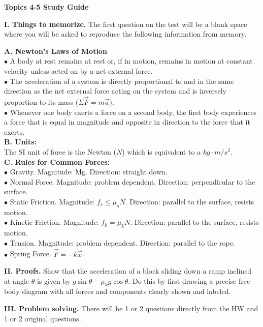 \documentclass[11pt]{article}
\begin{document}
{\centering
\textbf{Topics 4-5 Study Guide} \par
\vspace{\baselineskip}
}

\textbf{I. Things to memorize.}
The first question on the test will be a blank space where you will be asked to reproduce the following information from memory.
\vspace{0.5\baselineskip}

\begin{addmargin}[1em]{0em}%
\textbf{A. Newton's Laws of Motion} \\
$\bullet$ A body at rest remains at rest or, if in motion, remains in motion at constant velocity unless acted on by a net external force. \\
$\bullet$ The acceleration of a system is directly proportional to and in the same direction as the net external force acting on the system and is inversely proportion to its mass ($\Sigma \vec{F} = m \vec{a}$). \\
$\bullet$ Whenever one body exerts a force on a second body, the first body experiences a force that is equal in magnitude and opposite in direction to the force that it exerts. \\

\textbf{B. Units:} \\
The SI unit of force is the Newton ($N$) which is equivalent to a $kg\cdot m/s^2$. \\

\textbf{C. Rules for Common Forces:} \\
$\bullet$ Gravity. Magnitude: Mg. Direction: straight down. \\
$\bullet$ Normal Force. Magnitude: problem dependent. Direction: perpendicular to the surface. \\
$\bullet$ Static Friction. Magnitude: $f_s \leq \mu_s N$. Direction: parallel to the surface, resists motion. \\
$\bullet$ Kinetic Friction. Magnitude: $f_k = \mu_k N$. Direction: parallel to the surface, resists motion. \\
$\bullet$ Tension. Magnitude: problem dependent. Direction: parallel to the rope. \\
$\bullet$ Spring Force. $\vec{F} = -k\vec{x}$. \\
\end{addmargin}

\vspace{\baselineskip}
\textbf{II. Proofs.}
Show that the acceleration of a block sliding down a ramp inclined at angle $\theta$ is given by $g\sin\theta - \mu_k g\cos\theta$.
Do this by first drawing a precise free-body diagram with all forces and components clearly shown and labeled.

\vspace{\baselineskip}
\textbf{III. Problem solving.}
There will be 1 or 2 questions directly from the HW and 1 or 2 original questions.
\end{document}
